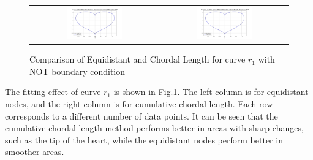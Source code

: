 \documentclass[a4paper]{article}
\begin{document}
\begin{sloppypar}
\begin{figure}[H]
\begin{tabular}{cc}
    \includegraphics[width=0.45\textwidth]{../figure/problemE/N_160_r1_BSpline_Equidistant_NOT.png} &
    \includegraphics[width=0.45\textwidth]{../figure/problemE/N_160_r1_BSpline_ChordalLength_NOT.png} \\
  \end{tabular}
  \renewcommand{\figurename}{Fig.}
  \caption{Comparison of Equidistant and Chordal Length for curve \(r_1\) with NOT boundary condition}
  \label{fig:r1_nodeType_compare}
\end{figure}

The fitting effect of curve \(r_1\) is shown in
Fig.\ref{fig:r1_nodeType_compare}. The left column is for equidistant nodes,
and the right column is for cumulative chordal length. Each row corresponds to
a different number of data points. It can be seen that the cumulative chordal
length method performs better in areas with sharp changes, such as the tip of
the heart, while the equidistant nodes perform better in smoother areas.


\end{sloppypar}
\end{document}
